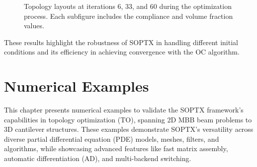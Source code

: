 \documentclass[mathpazo]{cicp}
\begin{document}
\vspace{-2ex} %
\begin{figure}[htp]
	\centering
	\caption{Topology layouts at iterations 6, 33, and 60 during the optimization process. Each subfigure includes the compliance and volume fraction values.}
	\label{fig:canti_1_all}
\end{figure}
\vspace{-2ex} %

These results highlight the robustness of SOPTX in handling different initial conditions and its efficiency in achieving convergence with the OC algorithm.

\section{Numerical Examples}
This chapter presents numerical examples to validate the SOPTX framework's capabilities in topology optimization (TO), spanning 2D MBB beam problems to 3D cantilever structures. These examples demonstrate SOPTX's versatility across diverse partial differential equation (PDE) models, meshes, filters, and algorithms, while showcasing advanced features like fast matrix assembly, automatic differentiation (AD), and multi-backend switching.
\end{document}
